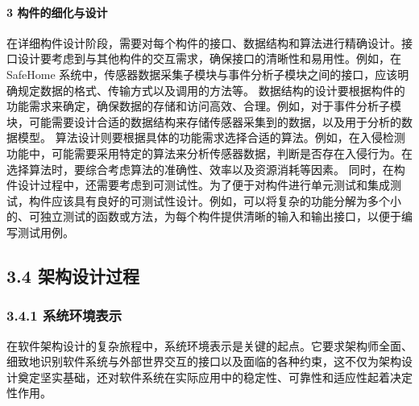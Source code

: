 \paragraph{3 构件的细化与设计}\label{ux6784ux4ef6ux7684ux7ec6ux5316ux4e0eux8bbeux8ba1}
在详细构件设计阶段，需要对每个构件的接口、数据结构和算法进行精确设计。接口设计要考虑到与其他构件的交互需求，确保接口的清晰性和易用性。例如，在 SafeHome
系统中，传感器数据采集子模块与事件分析子模块之间的接口，应该明确规定数据的格式、传输方式以及调用的方法等。
数据结构的设计要根据构件的功能需求来确定，确保数据的存储和访问高效、合理。例如，对于事件分析子模块，可能需要设计合适的数据结构来存储传感器采集到的数据，以及用于分析的数据模型。
算法设计则要根据具体的功能需求选择合适的算法。例如，在入侵检测功能中，可能需要采用特定的算法来分析传感器数据，判断是否存在入侵行为。在选择算法时，要综合考虑算法的准确性、效率以及资源消耗等因素。
同时，在构件设计过程中，还需要考虑到可测试性。为了便于对构件进行单元测试和集成测试，构件应该具有良好的可测试性设计。例如，可以将复杂的功能分解为多个小的、可独立测试的函数或方法，为每个构件提供清晰的输入和输出接口，以便于编写测试用例。
\subsection{3.4 架构设计过程}\label{ux67b6ux6784ux8bbeux8ba1ux8fc7ux7a0b} \subsubsection{3.4.1
系统环境表示}\label{ux7cfbux7edfux73afux5883ux8868ux793a}
在软件架构设计的复杂旅程中，系统环境表示是关键的起点。它要求架构师全面、细致地识别软件系统与外部世界交互的接口以及面临的各种约束，这不仅为架构设计奠定坚实基础，还对软件系统在实际应用中的稳定性、可靠性和适应性起着决定性作用。
